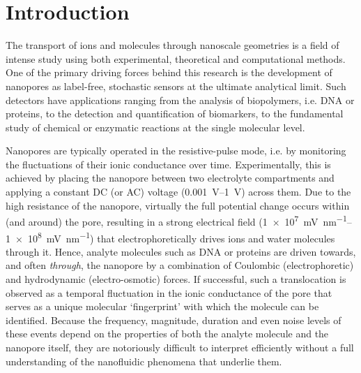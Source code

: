 \documentclass[journal=ancac3,manuscript=article,etalmode=truncate,maxauthors=0,layout=twocolumn]{achemso}
\begin{document}
\section{Introduction}

The transport of ions and molecules through nanoscale geometries is a field of intense study using both
experimental, theoretical and computational methods.\cite{Sparreboom-2010,Bocquet-2010,Maffeo-2012,
Thomas-2014,Wang-2014,Kim-2015} One of the primary driving forces behind this research is the development of
nanopores as label-free, stochastic sensors at the ultimate analytical limit.\cite{Bayley-2001,
Dekker-2007,Venkatesan-2011,Zhang-2016} Such detectors have applications ranging from the analysis of
biopolymers, i.e. DNA\cite{Deamer-2016,Kasianowicz-1996,Meller-2000,Maglia-2008,Butler-2008,Stoddart-2009,
Franceschini-2013,Jain-2018} or proteins,\cite{Restrepo-Perez-2018,Talaga-2009,Rodriguez-Larrea-2013,
Nivala-2013,Kennedy-2016} to the detection and quantification of biomarkers,\cite{Chen-2013,Soskine-2012,
Niedzwiecki-2013,VanMeervelt-2014,Huang-2017,Liu-2018,Galenkamp-2018} to the fundamental study of chemical or
enzymatic reactions at the single molecular level.\cite{Willems-VanMeervelt-2017,Lieberman-2010,
Nivala-2013,Ho-2015,Laszlo-2017}

Nanopores are typically operated in the resistive-pulse mode, i.e. by monitoring the fluctuations of their
ionic conductance over time.\cite{Bayley-2001,Dekker-2007,Maglia-2010,Venkatesan-2011} Experimentally, this is
achieved by placing the nanopore between two electrolyte compartments and applying a constant DC (or AC)
voltage (\SIrange{0.001}{1}{\volt}) across them. Due to the high resistance of the nanopore, virtually the
full potential change occurs within (and around) the pore, resulting in a strong electrical field
(\SIrange{1e7}{1e8}{\mV\per\nm}) that electrophoretically drives ions and water molecules through
it.\cite{Wong-2007,Mao-2014,Haywood-2014,Laohakunakorn-2015} Hence, analyte molecules such as DNA or proteins
are driven towards, and often \emph{through}, the nanopore by a combination of Coulombic (electrophoretic) and
hydrodynamic (electro-osmotic) forces.\cite{Wong-2007,Grosberg-2010,Muthukumar-2010, Muthukumar-2014} If
successful, such a translocation is observed as a temporal fluctuation in the ionic conductance of the pore
that serves as a unique molecular `fingerprint' with which the molecule can be identified.\cite{Yusko-2017}
Because the frequency, magnitude, duration and even noise levels of these events depend on the properties of
both the analyte molecule and the nanopore itself, they are notoriously difficult to interpret efficiently
without a full understanding of the nanofluidic phenomena that underlie them.
\end{document}
